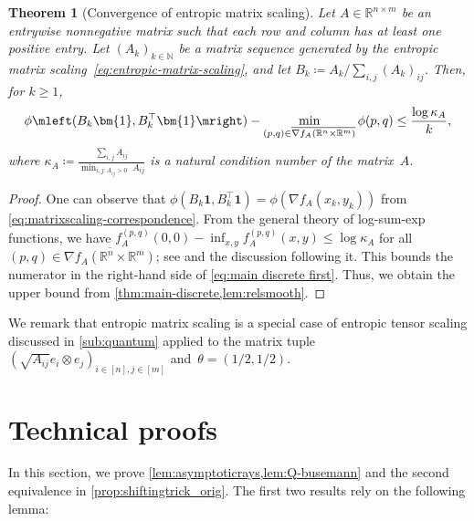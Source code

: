 \documentclass[11pt,letterpaper]{article}
\newtheorem{theorem}{Theorem}[section]
\numberwithin{equation}{section}
\newcommand{\RR}{\mathbb{R}}
\newcommand{\NN}{\mathbb{N}}
\begin{document}
\begin{theorem}[Convergence of entropic matrix scaling]\label{thm:matrix scaling}
    Let $A \in \RR^{n \times m}$ be an entrywise nonnegative matrix such that each row and column has at least one positive entry.
    Let $(A_k)_{k \in \NN}$ be a matrix sequence generated by the entropic matrix scaling~\eqref{eq:entropic-matrix-scaling}, and let $B_k \coloneqq A_k / \sum_{i, j}(A_k)_{ij}$.
    Then, for $k\geq1$,
    \[
        \phi\mleft(B_k\bm{1} , B_k^{\top}\bm{1}\mright) - \min_{(p, q) \in \overline{\nabla f_A(\RR^n \times \RR^m)}}\phi(p, q) \le \frac{\log \kappa_A}{k},
    \]
    where $\kappa_A \coloneqq  \frac{\sum_{i,j} A_{ij}}{\min_{i,j : A_{ij}>0}\; A_{ij}}$ is a natural condition number of the matrix~$A$.
\end{theorem}
\begin{proof}
    One can observe that $\phi(B_k\bm{1},B_k^{\top}\bm{1}) = \phi(\nabla f_A(x_k, y_k))$ from \cref{eq:matrixscaling-correspondence}.
    From the general theory of log-sum-exp functions, we have $f_A^{(p, q)}(0, 0) - \inf_{x, y} f_A^{(p, q)}(x, y) \le \log\kappa_A$ for all $(p, q) \in \overline{\nabla f_A(\RR^n \times \RR^m)}$; see \cite[Eq.~(1.9)]{BLNW2020} and the discussion following it.
    This bounds the numerator in the right-hand side of \cref{eq:main discrete first}.
    Thus, we obtain the upper bound from \cref{thm:main-discrete,lem:relsmooth}.
\end{proof}

We remark that entropic matrix scaling is a special case of entropic tensor scaling discussed in \cref{sub:quantum} applied to the matrix tuple $(\sqrt{A_{ij}}e_i\otimes e_j)_{i \in [n], j \in [m]}$ and~$\theta=(1/2,1/2)$.

\section{Technical proofs}
\label{app:technical proofs}
In this section, we prove \cref{lem:asymptoticrays,lem:Q-busemann} and the second equivalence in \cref{prop:shiftingtrick_orig}.
The first two results rely on the following lemma:
\end{document}
